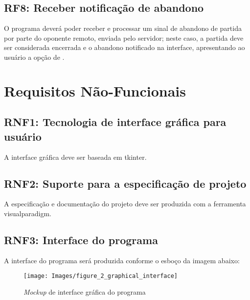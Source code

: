 \subsection{RF8: Receber notificação de abandono} \label{subsection:RF8} 
O programa deverá poder receber e processar um sinal de abandono de partida por parte do oponente remoto, enviada pelo
servidor; neste caso, a partida deve ser considerada encerrada e o abandono notificado na interface, apresentando ao 
usuário a opção de .

\section{Requisitos Não-Funcionais}

\subsection{RNF1: Tecnologia de interface gráfica para usuário} \label{subsection:RNF1}
A interface gráfica deve ser baseada em \gls{tkinter}.

\subsection{RNF2: Suporte para a especificação de projeto} \label{subsection:RNF2}
A especificação e documentação do projeto deve ser produzida com a ferramenta \gls{visualparadigm}.

\subsection{RNF3: Interface do programa} \label{subsection:RNF3}
A interface do programa será produzida conforme o esboço da imagem abaixo:

\begin{figure}[h]
    \centering
    \texttt{[image: Images/figure\_2\_graphical\_interface]}
    \caption{\textit{Mockup} de interface gráfica do programa}
    \label{fig:configuracao tabuleiro}
\end{figure}

